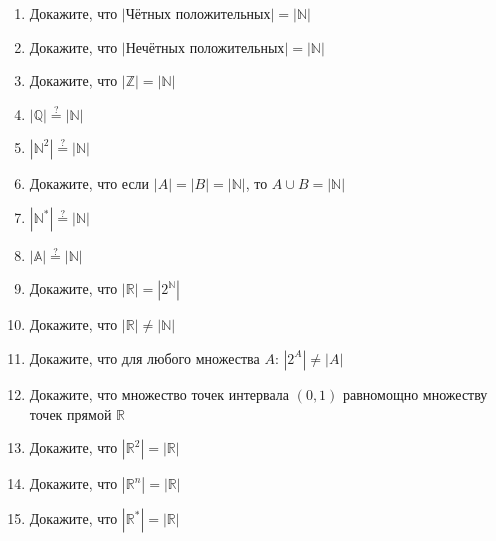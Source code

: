 \documentclass{article}
\begin{document}
\begin{enumerate}[label*=\protect\fbox{\arabic{enumi}}]
	
\item Докажите, что $|$Чётных положительных$| = |\mathbb{N}| $

\item Докажите, что $|$Нечётных положительных$| = |\mathbb{N}| $

\item Докажите, что $|\mathbb{Z}| = |\mathbb{N}|$

\item $|\mathbb{Q}| \stackrel{?}{=} |\mathbb{N}|$

\item $|\mathbb{N}^2| \stackrel{?}{=} |\mathbb{N}|$

\item Докажите, что если $|A| = |B| = |\mathbb{N}|$, то $A\cup B = |\mathbb{N}|$

\item $|\mathbb{N}^*| \stackrel{?}{=} |\mathbb{N}|$

\item $|\mathbb{A}| \stackrel{?}{=} |\mathbb{N}|$

\item Докажите, что $|\mathbb{R}| = |2^{\mathbb{N}}|$

\item Докажите, что $|\mathbb{R}| \neq |\mathbb{N}|$

\item Докажите, что для любого множества $A$: $|2^A| \neq |A|$

\item Докажите, что множество точек интервала $(0,1)$ равномощно множеству точек прямой $\mathbb{R}$

\item Докажите, что $|\mathbb{R}^2| = |\mathbb{R}|$

\item Докажите, что $|\mathbb{R}^n| = |\mathbb{R}|$

\item Докажите, что $|\mathbb{R}^*| = |\mathbb{R}|$








\end{enumerate}
\end{document}
